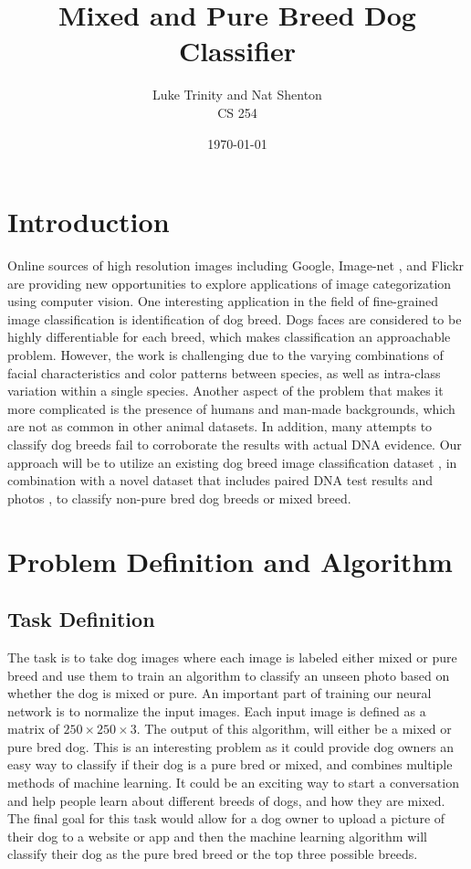 \documentclass[12pt]{article}
\title{Mixed and Pure Breed Dog Classifier}
\date{\today}
\author{Luke Trinity and Nat Shenton \\  CS 254}
\begin{document}
 
\maketitle
\section{Introduction}

Online sources of high resolution images including Google, Image-net \cite{deng2009imagenet}, and Flickr are providing new opportunities to explore applications of image categorization using computer vision. One interesting application in the field of fine-grained image classification is identification of dog breed. Dogs faces are considered to be highly differentiable for each breed, which makes classification an approachable problem.  However, the work is challenging due to the varying combinations of facial characteristics and color patterns between species, as well as intra-class variation within a single species. Another aspect of the problem that makes it more complicated is the presence of humans and man-made backgrounds, which are not as common in other animal datasets. In addition, many attempts to classify dog breeds fail to corroborate the results with actual DNA evidence. Our approach will be to utilize an existing dog breed image classification dataset \cite{khosla2011novel}, in combination with a novel dataset that includes paired DNA test results and photos \cite{voith2009comparison}, to  classify non-pure bred dog breeds or mixed breed. 

\section{Problem Definition and Algorithm}

\subsection{Task Definition}

The task is to take dog images where each image is labeled either mixed or pure breed and use them to train an algorithm to classify an unseen photo based on whether the dog is mixed or pure.  An important part of training our neural network is to normalize the input images.  Each input image is defined as a matrix of $250\times 250\times3$.  The output of this algorithm, will either be a mixed or pure bred dog. This is an interesting problem as it could provide dog owners an easy way to classify if their dog is a pure bred or mixed, and combines multiple methods of machine learning. It could be an exciting way to start a conversation and help people learn about different breeds of dogs, and how they are mixed. The final goal for this task would allow for a dog owner to upload a picture of their dog to a website or app and then the machine learning algorithm will classify their dog as the pure bred breed or the top three possible breeds.
\end{document}
